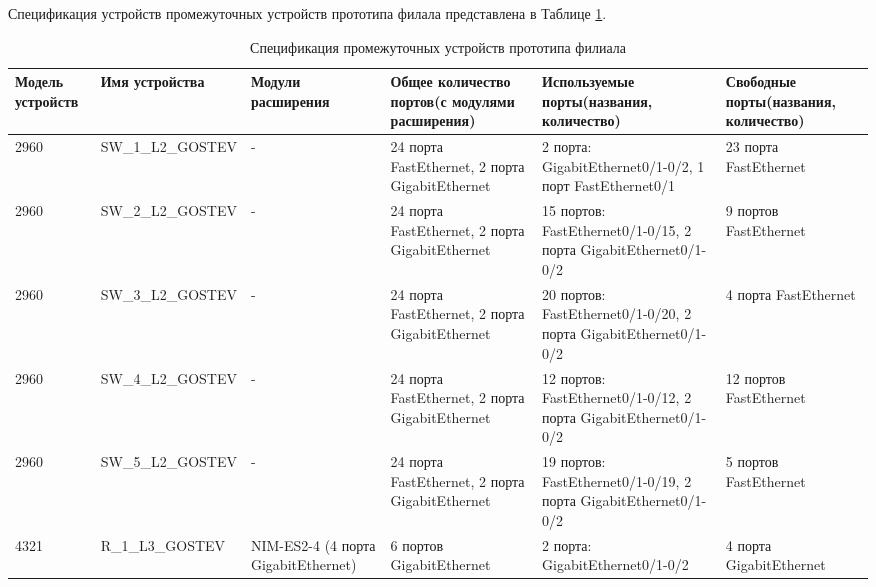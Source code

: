 \documentclass[14pt, a4paper]{extarticle}
\numberwithin{equation}{section}
\begin{document}
\begin{landscape}
        
Спецификация устройств промежуточных устройств прототипа филала представлена в Таблице \ref{table:filialDevicesSpecs}.

\begin{table}[H]
\centering
\small
\caption{Спецификация промежуточных устройств прототипа филиала}
\begin{tabular}{|m{2.5cm}|m{4cm}|m{3cm}|m{4.2cm}|m{5.3cm}|m{4cm}|}
\hline
\textbf{Модель устройств} & \textbf{Имя устройства} & \textbf{Модули расширения} & \textbf{Общее количество портов(с модулями расширения)} & \textbf{Используемые порты(названия, количество)} & \textbf{Свободные порты(названия, количество)} \\
\hline
2960 & 
SW\_1\_L2\_GOSTEV & 
- & 
24 порта FastEthernet, 2 порта GigabitEthernet &
2 порта: GigabitEthernet0/1-0/2, 1 порт FastEthernet0/1 &
23 порта FastEthernet \\
\hline
2960 & 
SW\_2\_L2\_GOSTEV & 
- & 
24 порта FastEthernet, 2 порта GigabitEthernet & 
15 портов: FastEthernet0/1-0/15, 2 порта GigabitEthernet0/1-0/2 & 
9 портов FastEthernet \\
\hline
2960 &
SW\_3\_L2\_GOSTEV &
- &
24 порта FastEthernet, 2 порта GigabitEthernet &
20 портов: FastEthernet0/1-0/20, 2 порта GigabitEthernet0/1-0/2 &
4 порта FastEthernet \\
\hline
2960 &
SW\_4\_L2\_GOSTEV &
- &
24 порта FastEthernet, 2 порта GigabitEthernet &
12 портов: FastEthernet0/1-0/12, 2 порта GigabitEthernet0/1-0/2 &
12 портов FastEthernet \\
\hline
2960 &
SW\_5\_L2\_GOSTEV &
- &
24 порта FastEthernet, 2 порта GigabitEthernet &
19 портов: FastEthernet0/1-0/19, 2 порта GigabitEthernet0/1-0/2 &
5 портов FastEthernet \\
\hline
4321 &
R\_1\_L3\_GOSTEV &
NIM-ES2-4 (4 порта GigabitEthernet) &
6 портов GigabitEthernet &
2 порта: GigabitEthernet0/1-0/2 &
4 порта GigabitEthernet \\
\hline
\end{tabular}
\label{table:filialDevicesSpecs}
\end{table}
\end{landscape}
\end{document}
